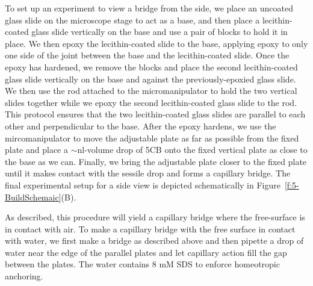 To set up an experiment to view a bridge from the side, we place an uncoated glass slide on the microscope stage to act as a base, and then place a lecithin-coated glass slide vertically on the base and use a pair of blocks to hold it in place.
We then epoxy the lecithin-coated slide to the base, applying epoxy to only one side of the joint between the base and the lecithin-coated slide.
Once the epoxy has hardened, we remove the blocks and place the second lecithin-coated glass slide vertically on the base and against the previously-epoxied glass slide.
We then use the rod attached to the micromanipulator to hold the two vertical slides together while we epoxy the second lecithin-coated glass slide to the rod.
This protocol ensures that the two lecithin-coated glass slides are parallel to each other and perpendicular to the base.
After the epoxy hardens, we use the mircomanipulator to move the adjustable plate as far as possible from the fixed plate and place a $\sim$nl-volume drop of 5CB onto the fixed vertical plate as close to the base as we can.
Finally, we bring the adjustable plate closer to the fixed plate until it makes contact with the sessile drop and forms a capillary bridge.
The final experimental setup for a side view is depicted schematically in Figure~\ref{f:5-BuildSchemaic}(B).

As described, this procedure will yield a capillary bridge where the free-surface is in contact with air.
To make a capillary bridge with the free surface in contact with water, we first make a bridge as described above and then pipette a drop of water near the edge of the parallel plates and let capillary action fill the gap between the plates.
The water contains 8 mM SDS to enforce homeotropic anchoring.




